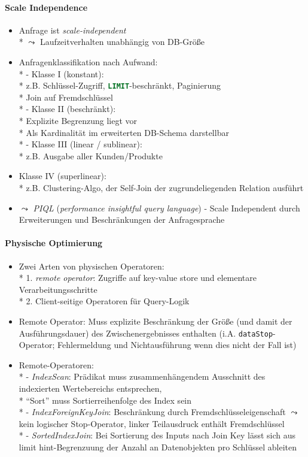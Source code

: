 \paragraph{Scale Independence}
\begin{itemize}
	\item Anfrage ist \emph{scale-independent}
		\\*
		\( \leadsto \) Laufzeitverhalten unabhängig von DB-Größe
	\item Anfragenklassifikation nach Aufwand: \\*
		- Klasse I (konstant):
			\\*
			z.B. Schlüssel-Zugriff, \lstinline[language=sql]{LIMIT}-beschränkt, Paginierung\\*
			Join auf Fremdschlüssel \\*
		- Klasse II (beschränkt):
			\\*
			Explizite Begrenzung liegt vor
			\\*
			Als Kardinalität im erweiterten DB-Schema darstellbar \\*
		- Klasse III (linear / sublinear):
			\\*
			z.B. Ausgabe aller Kunden/Produkte
		\item Klasse IV (superlinear):
			\\*
			z.B. Clustering-Algo, der Self-Join der zugrundeliegenden Relation ausführt
	\item \( \leadsto \) \emph{PIQL} (\emph{performance insightful query language}) - Scale Independent durch Erweiterungen und Beschränkungen der Anfragesprache
\end{itemize}

\paragraph{Physische Optimierung}
\begin{itemize}
	\item Zwei Arten von physischen Operatoren: \\*
		1. \emph{remote operator}: Zugriffe auf key-value store und elementare Verarbeitungsschritte \\*
		2. Client-seitige Operatoren für Query-Logik
	\item Remote Operator: Muss explizite Beschränkung der Größe (und damit der Ausführungsdauer) des Zwischenergebnisses enthalten (i.A. \lstinline{dataStop}-Operator; Fehlermeldung und Nichtausführung wenn dies nicht der Fall ist)
	\item Remote-Operatoren: \\*
		- \emph{IndexScan}: Prädikat muss zusammenhängendem Ausschnitt des indexierten Wertebereichs entsprechen,\\*
		``Sort'' muss Sortierreihenfolge des Index sein \\*
		- \emph{IndexForeignKeyJoin}: Beschränkung durch Fremdschlüsseleigenschaft \( \leadsto \) kein logischer Stop-Operator, linker Teilausdruck enthält Fremdschlüssel \\*
		- \emph{SortedIndexJoin}: Bei Sortierung des Inputs nach Join Key lässt sich aus limit hint-Begrenzuung der Anzahl an Datenobjekten pro Schlüssel ableiten
\end{itemize}

